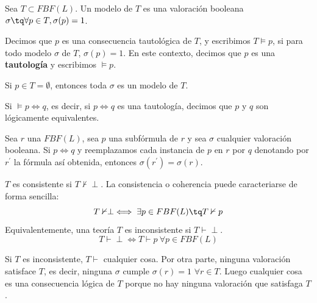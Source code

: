 \begin{defn}[Modelo]
	Sea $T\subset FBF(L)$. Un modelo de $T$ es una valoración booleana $\sigma \tq \forall p\in T, \sigma (p) = 1$.
\end{defn}

\begin{defn}
	Decimos que $p$ es una consecuencia tautológica de $T$, y escribimos $T\vDash p$, si para todo modelo $\sigma$ de $T$, $\sigma(p) = 1$. En este contexto, decimos que $p$ es una \textbf{tautología} y escribimos  $\vDash p$.
\end{defn}

\begin{obs}
	Si $p\in T = \emptyset$, entonces toda $\sigma$ es un modelo de $T$.
\end{obs}

\newpage

\begin{defn}
	Si $\vDash p \iff q$, es decir, si $p\iff q$ es una tautología, decimos que $p$ y $q$ son lógicamente equivalentes.
\end{defn}

\begin{obs}
	Sea $r$ una $FBF(L)$, sea $p$ una subfórmula de $r$ y sea $\sigma$ cualquier valoración booleana. Si $p\iff q$ y reemplazamos cada instancia de $p$ en $r$ por $q$ denotando por $r^\prime$ la fórmula así obtenida, entonces $\sigma(r^\prime) = \sigma(r)$.
\end{obs}

\begin{defn}
 $T$ es consistente si $T\nvdash \perp$. La consistencia o coherencia puede caracteriarse de forma sencilla:
 $$T\nvdash\perp \iff \exists p\in FBF(L) \tq  T\nvdash p$$ 
 Equivalentemente, una teoría $T$ es inconsistente si $T\vdash \perp$.
 $$T\vdash\perp \iff T\vdash p\ \forall p\in FBF(L)$$

\end{defn}

\begin{obs}
	Si $T$ es inconsistente, $T\vdash$ cualquier cosa.
	Por otra parte, ninguna valoración satisface $T$, es decir, ninguna $\sigma$ cumple $\sigma(r) = 1$ $\forall r\in T$. Luego cualquier cosa es una consecuencia lógica de $T$ porque no hay ninguna valoración que satisfaga $T$.
\end{obs}

